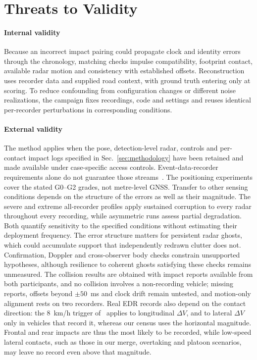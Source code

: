 \section{Threats to Validity}
\label{sec:threat}

\paragraph{Internal validity}
Because an incorrect impact pairing could propagate clock and identity
errors through the chronology, matching checks impulse compatibility,
footprint contact, available radar motion and consistency with
established offsets. Reconstruction uses recorder data and supplied road
context, with ground truth entering only at scoring. To reduce
confounding from configuration changes or different noise realizations,
the campaign fixes recordings, code and settings and reuses identical
per-recorder perturbations in corresponding conditions.

\paragraph{External validity}
The method applies when the pose, detection-level radar, controls and
per-contact impact logs specified in Sec.~\ref{sec:methodology} have been
retained and made available under case-specific access controls.
Event-data-recorder requirements alone do
not guarantee those streams~\cite{cfr563}. The positioning experiments
cover the stated G0--G2 grades, not metre-level GNSS.
Transfer to other sensing conditions depends on the structure of the
errors as well as their magnitude. The severe and extreme all-recorder
profiles apply sustained corruption to every radar throughout every
recording, while asymmetric runs assess partial degradation. Both quantify
sensitivity to the specified conditions without estimating their
deployment frequency. The error structure
matters for persistent radar ghosts, which could
accumulate support that independently redrawn clutter does not.
Confirmation, Doppler and cross-observer body checks constrain
unsupported hypotheses, although resilience to coherent ghosts
satisfying these checks remains unmeasured. The collision results are
obtained with impact reports available from both participants, and no
collision involves a non-recording vehicle; missing reports, offsets
beyond $\pm50$~ms and clock drift remain untested, and motion-only
alignment rests on two recorders. Real EDR records also depend on the
contact direction: the 8~km/h trigger of~\cite{cfr563} applies to
longitudinal $\Delta V$, and to lateral $\Delta V$ only in vehicles that
record it, whereas our census uses the horizontal magnitude. Frontal and
rear impacts are thus the most likely to be recorded, while low-speed
lateral contacts, such as those in our merge, overtaking and platoon
scenarios, may leave no record even above that magnitude.

